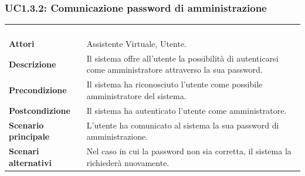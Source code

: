 \subsubsection{UC1.3.2: Comunicazione password di amministrazione}
\label{UC1.3.2}
\begin{longtable}{l|p{10cm}}
	\rowcolor[gray]{0.8} \multicolumn{2}{c}{} \\
	\rowcolor[gray]{0.8} \multicolumn{2}{c}{\textbf{UC1.3.2 - Comunicazione password di amministrazione}} \\
	\rowcolor[gray]{0.8} \multicolumn{2}{c}{} \\
	\hline
	&\\
	\textbf{Attori} & Assistente Virtuale, Utente.\\[7pt]
	\textbf{Descrizione} & Il sistema offre all'utente la possibilità di autenticarsi come amministratore attraverso la sua password.\\[7pt]
	\textbf{Precondizione} & Il sistema ha riconosciuto l'utente come possibile amministratore del sistema.\\[7pt]
	\textbf{Postcondizione} & Il sistema ha autenticato l'utente come amministratore.\\[7pt]
	\textbf{Scenario principale} &L'utente ha comunicato al sistema la sua password di amministrazione.\\[7pt]
	\textbf{Scenari alternativi} & Nel caso in cui la password non sia corretta, il sistema la richiederà nuovamente.\\[7pt]\hline
\end{longtable}

